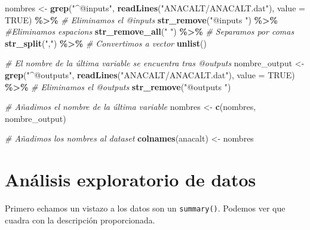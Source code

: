\documentclass[
]{article}
\newenvironment{Shaded}{\begin{snugshade}}{\end{snugshade}}
\newcommand{\AttributeTok}[1]{\textcolor[rgb]{0.13,0.29,0.53}{#1}}
\newcommand{\CommentTok}[1]{\textcolor[rgb]{0.56,0.35,0.01}{\textit{#1}}}
\newcommand{\ConstantTok}[1]{\textcolor[rgb]{0.56,0.35,0.01}{#1}}
\newcommand{\FunctionTok}[1]{\textcolor[rgb]{0.13,0.29,0.53}{\textbf{#1}}}
\newcommand{\NormalTok}[1]{#1}
\newcommand{\OtherTok}[1]{\textcolor[rgb]{0.56,0.35,0.01}{#1}}
\newcommand{\SpecialCharTok}[1]{\textcolor[rgb]{0.81,0.36,0.00}{\textbf{#1}}}
\newcommand{\StringTok}[1]{\textcolor[rgb]{0.31,0.60,0.02}{#1}}
\begin{document}
\begin{Shaded}
\begin{Highlighting}[]
\NormalTok{nombres }\OtherTok{\textless{}{-}} \FunctionTok{grep}\NormalTok{(}\StringTok{"\^{}@inputs"}\NormalTok{, }\FunctionTok{readLines}\NormalTok{(}\StringTok{"ANACALT/ANACALT.dat"}\NormalTok{), }\AttributeTok{value =} \ConstantTok{TRUE}\NormalTok{) }\SpecialCharTok{\%\textgreater{}\%} 
  \CommentTok{\# Eliminamos el @inputs}
  \FunctionTok{str\_remove}\NormalTok{(}\StringTok{"@inputs "}\NormalTok{) }\SpecialCharTok{\%\textgreater{}\%} 
  \CommentTok{\#Eliminamos espacions}
  \FunctionTok{str\_remove\_all}\NormalTok{(}\StringTok{" "}\NormalTok{) }\SpecialCharTok{\%\textgreater{}\%}
  \CommentTok{\# Separamos por comas}
  \FunctionTok{str\_split}\NormalTok{(}\StringTok{","}\NormalTok{) }\SpecialCharTok{\%\textgreater{}\%} 
  \CommentTok{\# Convertimos a vector}
  \FunctionTok{unlist}\NormalTok{()}

\CommentTok{\# El nombre de la última variable se encuentra tras @outputs}
\NormalTok{nombre\_output }\OtherTok{\textless{}{-}} \FunctionTok{grep}\NormalTok{(}\StringTok{"\^{}@outputs"}\NormalTok{, }\FunctionTok{readLines}\NormalTok{(}\StringTok{"ANACALT/ANACALT.dat"}\NormalTok{), }\AttributeTok{value =} \ConstantTok{TRUE}\NormalTok{) }\SpecialCharTok{\%\textgreater{}\%} 
  \CommentTok{\# Eliminamos el @outputs}
  \FunctionTok{str\_remove}\NormalTok{(}\StringTok{"@outputs "}\NormalTok{)}

\CommentTok{\# Añadimos el nombre de la última variable}
\NormalTok{nombres }\OtherTok{\textless{}{-}} \FunctionTok{c}\NormalTok{(nombres, nombre\_output)}

\CommentTok{\# Añadimos los nombres al dataset}
\FunctionTok{colnames}\NormalTok{(anacalt) }\OtherTok{\textless{}{-}}\NormalTok{ nombres}
\end{Highlighting}
\end{Shaded}

\hypertarget{anuxe1lisis-exploratorio-de-datos}{%
\section{Análisis exploratorio de
datos}\label{anuxe1lisis-exploratorio-de-datos}}

Primero echamos un vistazo a los datos son un \texttt{summary()}.
Podemos ver que cuadra con la descripción proporcionada.
\end{document}
